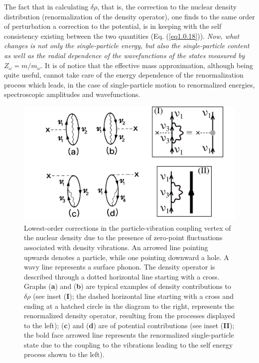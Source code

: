  The fact that in calculating $\delta\rho$, that is, the correction to the nuclear density distribution (renormalization of the density operator), one finds to the same order of perturbation a correction to the potential, is in keeping with the self consistency existing between the two quantities (Eq. (\ref{eq1.0.18})). \textit{Now, what changes is not only the single-particle energy, but also the single-particle content as well as the radial dependence of the wavefunctions of the states measured by $Z_\omega=m/m_\omega$}. It is of notice that the effective mass approximation, although being quite useful, cannot take care of the energy dependence of the renormalization process which leads, in the case of single-particle motion to renormalized energies, spectroscopic amplitudes and wavefunctions. 
\begin{figure}
	\centerline {
		\includegraphics*[width=15cm, angle=0.]{introduccion/figs/fig0_8_1}
	}
	\caption{Lowest-order corrections in the particle-vibration coupling vertex of the nuclear density due to the presence of zero-point fluctuations associated with density vibrations. An arrowed line pointing upwards denotes a particle, while one pointing downward a hole. A wavy line represents a surface phonon. The density operator is described through a dotted horizontal line starting with a cross. Graphs (\textbf{a}) and (\textbf{b}) are typical examples of density contributions to $\delta\rho$ (see inset (\textbf{I}); the dashed horizontal line starting with a cross and ending at a hatched circle in the diagram to the right, represents the renormalized density operator, resulting from the processes displayed to the left); (\textbf{c}) and (\textbf{d}) are of potential contributions (see inset (\textbf{II}); the bold face arrowed line represents the renormalized single-particle state due to the coupling to the vibrations leading to the self energy process shown to the left).}
	\label{fig0.5.1}
\end{figure}

